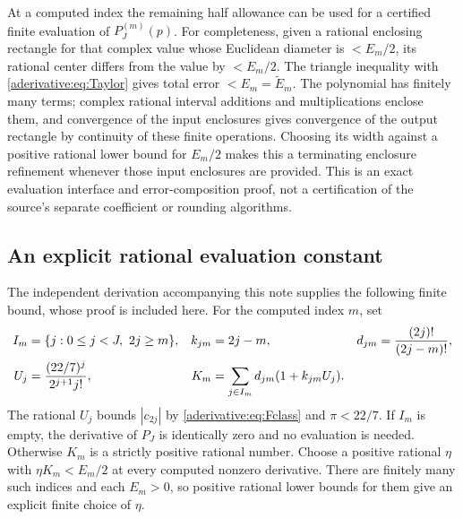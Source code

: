 At a computed index the remaining half allowance can be used
for a certified finite evaluation of $P_J^{(m)}(p)$.
For completeness, given a rational enclosing rectangle for
that complex value whose Euclidean diameter is $<E_m/2$,
its rational center differs from the value by $<E_m/2$.
The triangle inequality with \eqref{aderivative:eq:Taylor} gives total
error $<E_m=\widetilde E_m$. The polynomial has finitely
many terms; complex rational interval additions and
multiplications enclose them, and convergence of the input
enclosures gives convergence of the output rectangle by
continuity of these finite operations. Choosing its width
against a positive rational lower bound for $E_m/2$ makes
this a terminating enclosure refinement whenever those
input enclosures are provided. This is an exact evaluation
interface and error-composition proof, not a certification
of the source's separate coefficient or rounding algorithms.

\subsection{An explicit rational evaluation constant}
\label{aderivative:sec:evaluation}
The independent derivation accompanying this note supplies
the following finite bound, whose proof is included here.
For the computed index $m$, set
\begin{align}
I_m&=\{j:0\le j<J,\ 2j\ge m\},&
k_{jm}&=2j-m,& d_{jm}&=\frac{(2j)!}{(2j-m)!},\notag\\
U_j&=\frac{(22/7)^j}{2^{j+1}j!},&
K_m&=\sum_{j\in I_m}d_{jm}(1+k_{jm}U_j).
\label{aderivative:eq:Km}
\end{align}
The rational $U_j$ bounds $|c_{2j}|$ by \eqref{aderivative:eq:Fclass}
and $\pi<22/7$. If $I_m$ is empty, the derivative of $P_J$
is identically zero and no evaluation is needed. Otherwise
$K_m$ is a strictly positive rational number. Choose a
positive rational $\eta$ with $\eta K_m<E_m/2$ at every
computed nonzero derivative. There are finitely many such
indices and each $E_m>0$, so positive rational lower bounds
for them give an explicit finite choice of $\eta$.

